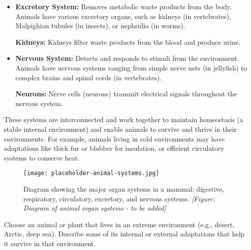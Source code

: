 \begin{itemize}
\begin{marginnote}
    \end{marginnote}
    \item \textbf{Excretory System:} Removes metabolic waste products from the body.  Animals have various excretory organs, such as kidneys (in vertebrates), Malpighian tubules (in insects), or nephridia (in worms).
    \begin{marginnote}
        \textbf{Kidneys:} Kidneys filter waste products from the blood and produce urine.
    \end{marginnote}
    \item \textbf{Nervous System:}  Detects and responds to stimuli from the environment.  Animals have nervous systems ranging from simple nerve nets (in jellyfish) to complex brains and spinal cords (in vertebrates).
    \begin{marginnote}
        \textbf{Neurons:} Nerve cells (neurons) transmit electrical signals throughout the nervous system.
    \end{marginnote}
\end{itemize}

These systems are interconnected and work together to maintain homeostasis (a stable internal environment) and enable animals to survive and thrive in their environments.  For example, animals living in cold environments may have adaptations like thick fur or blubber for insulation, or efficient circulatory systems to conserve heat.

\begin{figure}
\centering
\texttt{[image: placeholder-animal-systems.jpg]}
\caption{Diagram showing the major organ systems in a mammal: digestive, respiratory, circulatory, excretory, and nervous systems. \textit{[Figure: Diagram of animal organ systems - to be added]}}
\end{figure}


\begin{stopandthink}
Choose an animal or plant that lives in an extreme environment (e.g., desert, Arctic, deep sea). Describe some of its internal or external adaptations that help it survive in that environment.
\end{stopandthink}


